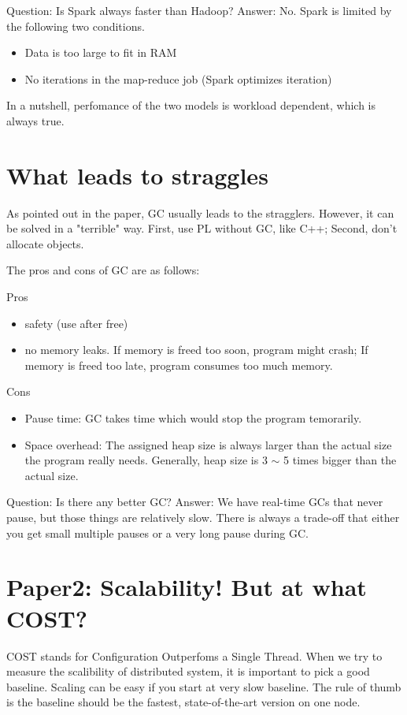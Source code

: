 \documentclass[twoside]{article}
\begin{document}
Question: Is Spark always faster than Hadoop?
Answer: No. Spark is limited by the following two conditions.
\begin{itemize}
  \item Data is too large to fit in RAM
  \item No iterations in the map-reduce job (Spark optimizes iteration)
\end{itemize}
In a nutshell, perfomance of the two models is workload dependent, which is always true.



\section{What leads to straggles}
As pointed out in the paper, GC usually leads to the stragglers. However, it can be solved in a "terrible" way. First, use PL without GC, like C++; Second, don't allocate objects.

The pros and cons of GC are as follows:

Pros
\begin{itemize}
  \item safety (use after free)
  \item no memory leaks. If memory is freed too soon, program might crash; If memory is freed too late, program consumes too much memory.
\end{itemize}

Cons
\begin{itemize}
  \item Pause time: GC takes time which would stop the program temorarily.
  \item Space overhead: The assigned heap size is always larger than the actual size the program really needs. Generally, heap size is 3 $\sim$ 5 times bigger than the actual size.
\end{itemize}

Question: Is there any better GC?
Answer: We have real-time GCs that never pause, but those things are relatively slow. There is always a trade-off that either you get small multiple pauses or a very long pause during GC.

\section{Paper2: Scalability! But at what COST?}
COST stands for Configuration Outperfoms a Single Thread. When we try to measure the scalibility of distributed system, it is important to pick a good baseline. Scaling can be easy if you start at very slow baseline. The rule of thumb is the baseline should be the fastest, state-of-the-art version on one node.
\end{document}
